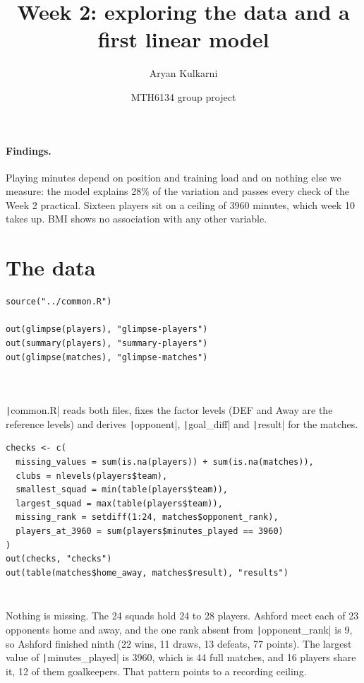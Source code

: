 \documentclass[12pt,notitlepage]{report}
\title{Week 2: exploring the data and a first linear model}
\author{Aryan Kulkarni}
\date{MTH6134 group project}
\begin{document}
\maketitle

\paragraph{Findings.}
Playing minutes depend on position and training load and on nothing else we
measure: the model explains 28\% of the variation and passes every check of
the Week 2 practical. Sixteen players sit on a ceiling of 3960 minutes, which
week 10 takes up. BMI shows no association with any other variable.

\section{The data}

\begin{verbatim}
source("../common.R")

out(glimpse(players), "glimpse-players")
out(summary(players), "summary-players")
out(glimpse(matches), "glimpse-matches")
\end{verbatim}

\inputminted{text}{output/glimpse-players.txt}
\inputminted{text}{output/summary-players.txt}
\inputminted{text}{output/glimpse-matches.txt}

\texttt|common.R| reads both files, fixes the factor levels (DEF and
Away are the reference levels) and derives \texttt|opponent|,
\texttt|goal_diff| and \texttt|result| for the matches.

\begin{verbatim}
checks <- c(
  missing_values = sum(is.na(players)) + sum(is.na(matches)),
  clubs = nlevels(players$team),
  smallest_squad = min(table(players$team)),
  largest_squad = max(table(players$team)),
  missing_rank = setdiff(1:24, matches$opponent_rank),
  players_at_3960 = sum(players$minutes_played == 3960)
)
out(checks, "checks")
out(table(matches$home_away, matches$result), "results")
\end{verbatim}

\inputminted{text}{output/checks.txt}
\inputminted{text}{output/results.txt}

Nothing is missing. The 24 squads hold 24 to 28 players. Ashford meet each of
23 opponents home and away, and the one rank absent from
\texttt|opponent_rank| is 9, so Ashford finished ninth (22 wins, 11
draws, 13 defeats, 77 points). The largest value of
\texttt|minutes_played| is 3960, which is 44 full matches, and 16
players share it, 12 of them goalkeepers. That pattern points to a recording
ceiling.
\end{document}
